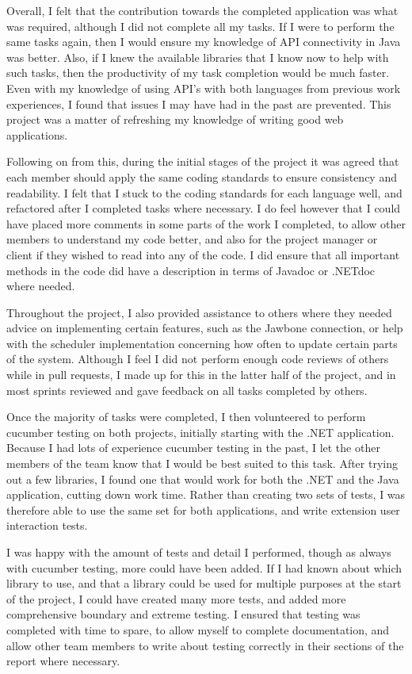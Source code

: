 Overall, I felt that the contribution towards the completed application was what was required, although I did not complete all my tasks. If I were to perform the same tasks again, then I would ensure my knowledge of API connectivity in Java was better. Also, if I knew the available libraries that I know now to help with such tasks, then the productivity of my task completion would be much faster. Even with my knowledge of using API’s with both languages from previous work experiences, I found that issues I may have had in the past are prevented. This project was a matter of refreshing my knowledge of writing good web applications. \par
Following on from this, during the initial stages of the project it was agreed that each member should apply the same coding standards to ensure consistency and readability. I felt that I stuck to the coding standards for each language well, and refactored after I completed tasks where necessary. I do feel however that I could have placed more comments in some parts of the work I completed, to allow other members to understand my code better, and also for the project manager or client if they wished to read into any of the code. I did ensure that all important methods in the code did have a description in terms of Javadoc or .NETdoc where needed. \par
Throughout the project, I also provided assistance to others where they needed advice on implementing certain features, such as the Jawbone connection, or help with the scheduler implementation concerning how often to update certain parts of the system. Although I feel I did not perform enough code reviews of others while in pull requests, I made up for this in the latter half of the project, and in most sprints reviewed and gave feedback on all tasks completed by others. \par
Once the majority of tasks were completed, I then volunteered to perform cucumber testing on both projects, initially starting with the .NET application. Because I had lots of experience cucumber testing in the past, I let the other members of the team know that I would be best suited to this task. After trying out a few libraries, I found one that would work for both the .NET and the Java application, cutting down work time. Rather than creating two sets of tests, I was therefore able to use the same set for both applications, and write extension user interaction tests. \par
 I was happy with the amount of tests and detail I performed, though as always with cucumber testing, more could have been added. If I had known about which library to use, and that a library could be used for multiple purposes at the start of the project, I could have created many more tests, and added more comprehensive boundary and extreme testing. I ensured that testing was completed with time to spare, to allow myself to complete documentation, and allow other team members to write about testing correctly in their sections of the report where necessary. \par
